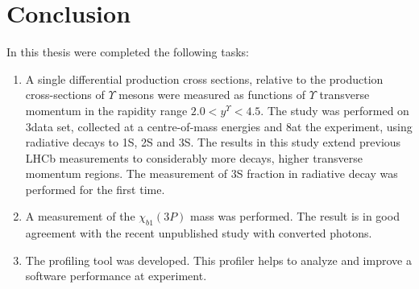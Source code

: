 \chapter{Conclusion}

In this thesis were completed the following tasks:

\begin{enumerate}

\item  A single differential \chib production cross sections,
relative to the production  cross-sections of $\Upsilon$ mesons were measured
as functions of $\Upsilon$ transverse momentum in the rapidity range $2.0 <
y^{\Upsilon} < 4.5$. The study  was performed on 3\invfb data set, collected at
a centre-of-mass energies  and 8\tev at the \lhcb experiment, using \chib
radiative decays to \Y1S, \Y2S and \Y3S. The results in this study extend
previous LHCb measurements to considerably more decays, higher transverse
momentum regions.  The measurement of \Y3S fraction in radiative \chibThreeP
decay was performed for the first time.

\item A measurement of the $\chi_{b1}(3P)$ mass was  performed. The result is
in good agreement with the recent \lhcb unpublished study with converted photons.

\item The profiling tool was developed. This profiler helps to analyze and improve a
software performance at \lhcb experiment.

\end{enumerate}

